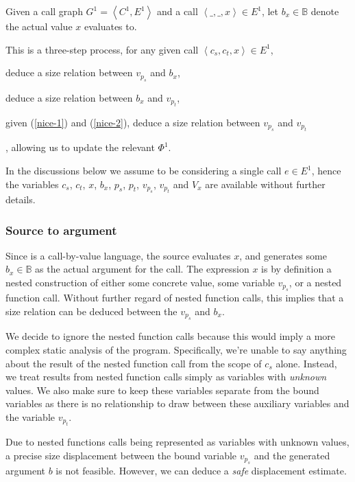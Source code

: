 \begin{definition} Given a call graph $G^1 = \left\langle C^1,
E^1\right\rangle$ and a call $\left\langle \_, \_, x \right\rangle \in E^1$,
let $b_x\in\mathbb{B}$ denote the actual value $x$ evaluates
to.\end{definition}

This is a three-step process, for any given call $\left\langle c_s, c_t, x
\right\rangle \in E^1$, \begin{inparaenum}[(1)]\item \label{nice-1} deduce a
size relation between $v_{p_s}$ and $b_x$, \item \label{nice-2} deduce a size
relation between $b_x$ and $v_{p_t}$, \item given (\ref{nice-1}) and
(\ref{nice-2}), deduce a size relation between $v_{p_s}$ and
$v_{p_t}$\end{inparaenum}, allowing us to update the relevant $\Phi^1$.

In the discussions below we assume to be considering a single call $e\in E^1$,
hence the variables $c_s$, $c_t$, $x$, $b_x$, $p_s$, $p_t$, $v_{p_s}$,
$v_{p_t}$ and $V_x$ are available without further details.

\subsubsection{Source to argument}

Since \D{} is a call-by-value language, the source evaluates $x$, and generates some
$b_x\in\mathbb{B}$ as the actual argument for the call. The expression $x$ is
by definition a nested construction of either some concrete value, some
variable $v_{p_s}$, or a nested function call. Without further regard of nested
function calls, this implies that a size relation can be deduced between the
$v_{p_s}$ and $b_x$.

We decide to ignore the nested function calls because this would imply a more
complex static analysis of the program. Specifically, we're unable to say
anything about the result of the nested function call from the scope of $c_s$
alone. Instead, we treat results from nested function calls simply as variables
with \emph{unknown} values. We also make sure to keep these variables separate
from the bound variables as there is no relationship to draw between these
auxiliary variables and the variable $v_{p_t}$.

Due to nested functions calls being represented as variables with unknown
values, a precise size displacement between the bound variable $v_{p_s}$ and
the generated argument $b$ is not feasible. However, we can deduce a
\emph{safe} displacement estimate.

